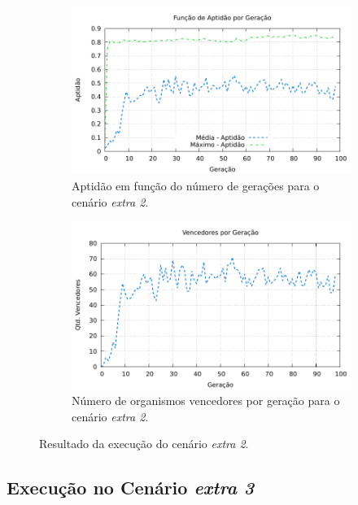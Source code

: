 
\begin{figure}[H]
\centering
	\begin{subfigure}[b]{0.4\textwidth}
        \includegraphics[width=\textwidth]{fig/extra2-fitness.pdf}
        \caption{Aptidão em função do número de gerações para o cenário
        \textit{extra 2}.}
	\end{subfigure}
	\begin{subfigure}[b]{0.4\textwidth}
        \includegraphics[width=\textwidth]{fig/extra2-winners.pdf}
        \caption{Número de organismos vencedores por geração para o cenário
        \textit{extra 2}.}
	\end{subfigure}

    \caption{Resultado da execução do cenário \textit{extra 2}.}
	\label{fig:extra2-results}
\end{figure}

\subsection{Execução no Cenário \textit{extra 3}}

